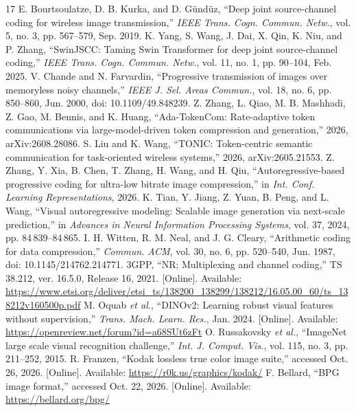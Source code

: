 \begin{thebibliography}{17}
 E. Bourtsoulatze, D. B. Kurka, and D. G\"und\"uz, ``Deep joint source-channel coding for wireless image transmission,'' \emph{IEEE Trans. Cogn. Commun. Netw.}, vol. 5, no. 3, pp. 567--579, Sep. 2019.
 K. Yang, S. Wang, J. Dai, X. Qin, K. Niu, and P. Zhang, ``SwinJSCC: Taming Swin Transformer for deep joint source-channel coding,'' \emph{IEEE Trans. Cogn. Commun. Netw.}, vol. 11, no. 1, pp. 90--104, Feb. 2025.
 V. Chande and N. Farvardin, ``Progressive transmission of images over memoryless noisy channels,'' \emph{IEEE J. Sel. Areas Commun.}, vol. 18, no. 6, pp. 850--860, Jun. 2000, doi: 10.1109/49.848239.
 Z. Zhang, L. Qiao, M. B. Mashhadi, Z. Gao, M. Bennis, and K. Huang, ``Ada-TokenCom: Rate-adaptive token communications via large-model-driven token compression and generation,'' 2026, arXiv:2608.28086.
 S. Liu and K. Wang, ``TONIC: Token-centric semantic communication for task-oriented wireless systems,'' 2026, arXiv:2605.21553.
 Z. Zhang, Y. Xia, B. Chen, T. Zhang, H. Wang, and H. Qiu, ``Autoregressive-based progressive coding for ultra-low bitrate image compression,'' in \emph{Int. Conf. Learning Representations}, 2026.
 K. Tian, Y. Jiang, Z. Yuan, B. Peng, and L. Wang, ``Visual autoregressive modeling: Scalable image generation via next-scale prediction,'' in \emph{Advances in Neural Information Processing Systems}, vol. 37, 2024, pp. 84\,839--84\,865.
 I. H. Witten, R. M. Neal, and J. G. Cleary, ``Arithmetic coding for data compression,'' \emph{Commun. ACM}, vol. 30, no. 6, pp. 520--540, Jun. 1987, doi: 10.1145/214762.214771.
 3GPP, ``NR; Multiplexing and channel coding,'' TS 38.212, ver. 16.5.0, Release 16, 2021. [Online]. Available: \url{https://www.etsi.org/deliver/etsi_ts/138200_138299/138212/16.05.00_60/ts_138212v160500p.pdf}
 M. Oquab \emph{et al.}, ``DINOv2: Learning robust visual features without supervision,'' \emph{Trans. Mach. Learn. Res.}, Jan. 2024. [Online]. Available: \url{https://openreview.net/forum?id=a68SUt6zFt}
 O. Russakovsky \emph{et al.}, ``ImageNet large scale visual recognition challenge,'' \emph{Int. J. Comput. Vis.}, vol. 115, no. 3, pp. 211--252, 2015.
 R. Franzen, ``Kodak lossless true color image suite,'' accessed Oct. 26, 2026. [Online]. Available: \url{https://r0k.us/graphics/kodak/}
 F. Bellard, ``BPG image format,'' accessed Oct. 22, 2026. [Online]. Available: \url{https://bellard.org/bpg/}

\end{thebibliography}
